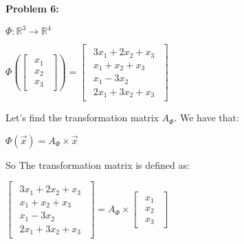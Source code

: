 \textbf{Problem 6:}

\singlespacing

\begin{math}
    \Phi: \mathbb{R}^3 \rightarrow \mathbb{R}^4
\end{math}

\singlespacing
\singlespacing

\begin{math}
    \Phi\left(\begin{bmatrix}
        \begin{array}{c}
            x_1 \\
            x_2 \\
            x_3
        \end{array}
    \end{bmatrix}
    \right)=\begin{bmatrix}
        \begin{array}{c}
            3x_1 + 2x_2 + x_3 \\
            x_1 + x_2 + x_3   \\
            x_1 - 3x_2        \\
            2x_1 + 3x_2 + x_3
        \end{array}
    \end{bmatrix}
\end{math}

\singlespacing
\singlespacing

Let's find the transformation matrix $A_\Phi$. We have that:

\singlespacing

\begin{math}
    \Phi(\vec{x})=A_\Phi \times \vec{x}
\end{math}

\singlespacing

So The transformation matrix is defined as:

\singlespacing

\begin{math}
    \begin{bmatrix}
        \begin{array}{c}
            3x_1 + 2x_2 + x_3 \\
            x_1 + x_2 + x_3   \\
            x_1 - 3x_2        \\
            2x_1 + 3x_2 + x_3
        \end{array}
    \end{bmatrix} =A_\Phi \times\begin{bmatrix}
        \begin{array}{c}
            x_1 \\
            x_2 \\
            x_3
        \end{array}
    \end{bmatrix}
\end{math}


